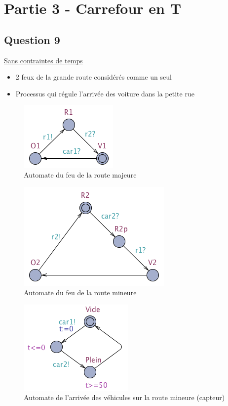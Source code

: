 \documentclass[11pt]{article}
\begin{document}
\section{Partie 3 - Carrefour en T}

\subsection{Question 9}

\href{https://github.com/masters-info-nantes/hong-cheng-lv/blob/master/ressources/part3/Q9-SansContraintesTemps.xml}{Sans contraintes de temps}

\begin{itemize}
	\item 2 feux de la grande route considérés comme un seul
	\item Processus qui régule l'arrivée des voiture dans la petite rue
\end{itemize}

\begin{figure}[H]
	\centering
	\includegraphics{ressources/part3/Q9-1.png}
	\caption{Automate du feu de la route majeure}
\end{figure}

\begin{figure}[H]
	\centering
	\includegraphics{ressources/part3/Q9-2.png}
	\caption{Automate du feu de la route mineure}
\end{figure}

\begin{figure}[H]
	\centering
	\includegraphics{ressources/part3/Q9-3.png}
	\caption{Automate de l'arrivée des véhicules sur la route mineure (capteur)}
\end{figure}
\end{document}
